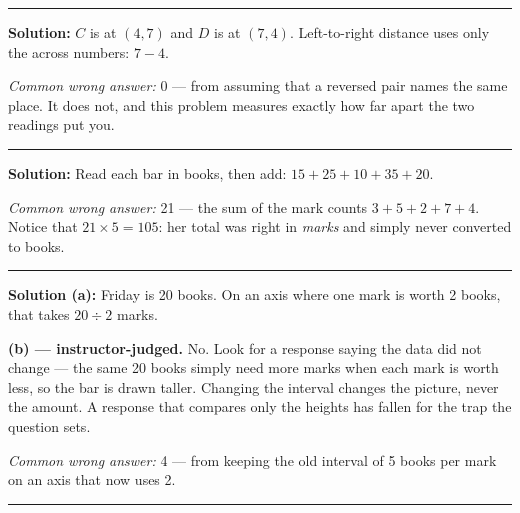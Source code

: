 \documentclass[12pt]{article}
\begin{document}
\vspace{0.15cm}\noindent\rule{\linewidth}{0.2pt}\vspace{0.15cm}


\textbf{Solution:} $C$ is at $(4, 7)$ and $D$ is at $(7, 4)$. Left-to-right distance uses only the across numbers: $7 - 4$. 

\emph{Common wrong answer:} 0 --- from assuming that a reversed pair names the same place. It does not, and this problem measures exactly how far apart the two readings put you.

\vspace{0.15cm}\noindent\rule{\linewidth}{0.2pt}\vspace{0.15cm}


\textbf{Solution:} Read each bar in books, then add: $15 + 25 + 10 + 35 + 20$. 

\emph{Common wrong answer:} 21 --- the sum of the mark counts $3 + 5 + 2 + 7 + 4$. Notice that $21 \times 5 = 105$: her total was right in \emph{marks} and simply never converted to books.

\vspace{0.15cm}\noindent\rule{\linewidth}{0.2pt}\vspace{0.15cm}


\textbf{Solution (a):} Friday is 20 books. On an axis where one mark is worth 2 books, that takes $20 \div 2$ marks. 

\textbf{(b) --- instructor-judged.} No. Look for a response saying the data did not change --- the same 20 books simply need more marks when each mark is worth less, so the bar is drawn taller. Changing the interval changes the picture, never the amount. A response that compares only the heights has fallen for the trap the question sets.

\emph{Common wrong answer:} 4 --- from keeping the old interval of 5 books per mark on an axis that now uses 2.

\vspace{0.15cm}\noindent\rule{\linewidth}{0.2pt}\vspace{0.15cm}
\end{document}
